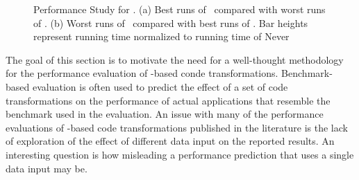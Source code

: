 
\begin{figure}
\begin{center}
  \end{center}
 \caption{Performance Study for \gcc. (a) Best runs of \FDI\ compared with worst runs of \llvm.  (b) Worst runs of \FDI\ compared with best runs of \llvm. Bar heights represent running time normalized to running time of Never}
  \label{fig:BestWorstComparison}
\end{figure}

The goal of this section is to motivate the need for a well-thought methodology for the performance evaluation of \FDO-based conde transformations. Benchmark-based evaluation is often used to predict the effect of a set of code transformations on the performance of actual applications that resemble the benchmark used in the evaluation. An issue with many of the performance evaluations of \FDO-based code transformations published in the literature is the lack of exploration of the effect of different data input on the reported results. An interesting question is how misleading a performance prediction that uses a single data input may be.

